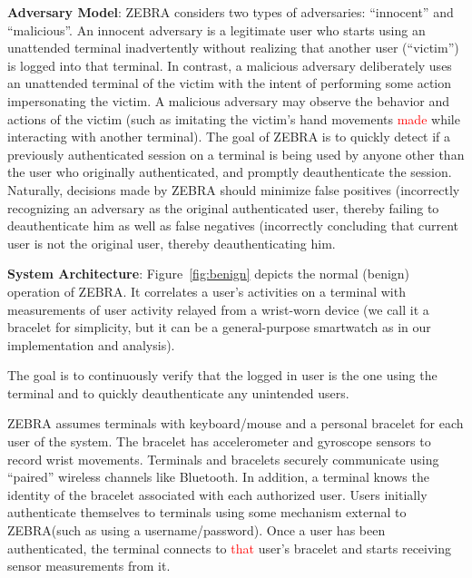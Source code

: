 \documentclass[conference]{IEEEtran}
\newcommand{\zebra}{ZEBRA\xspace}
\newif\ifabridged
\newcommand\changeMika[1]{\textcolor{red}{#1}}
\newcommand\changeAsokan[1]{\textcolor{red}{#1}}
\newcommand\changeMika[1]{{#1}}
\newcommand\changeAsokan[1]{{#1}}
\begin{document}
\vspace{2mm}
\noindent\textbf{Adversary Model}:
\zebra \changeMika{\cite{mare2014zebra}} considers two types of adversaries: ``innocent'' and ``malicious''. An innocent adversary is a legitimate user who starts using an unattended terminal inadvertently without realizing that another user (``victim'') is logged into that terminal. In contrast, a malicious adversary deliberately uses an unattended terminal of the victim with the intent of performing some action impersonating the victim. A malicious adversary may observe the behavior and actions of the victim (such as imitating the victim's hand movements \changeAsokan{made} while interacting with another terminal). The goal of \zebra is to quickly detect if a previously authenticated session on a terminal is being used by anyone other than the user who originally authenticated, and promptly deauthenticate the session. Naturally, decisions made by \zebra should minimize false positives
(incorrectly recognizing an adversary as the original authenticated user, thereby failing to deauthenticate him as well as false negatives (incorrectly concluding that current user is not the original user, thereby deauthenticating him.

\vspace{2mm}
\noindent\textbf{System Architecture}:
Figure~\ref{fig:benign} depicts the normal (benign) operation of \zebra.
It correlates a user's activities on a terminal with measurements of user activity relayed from a wrist-worn device (we call it a bracelet for simplicity, but it can be a general-purpose smartwatch as in our implementation and analysis). 
\ifabridged
\else
The goal is to continuously verify that the logged in user is the one using the terminal and to quickly deauthenticate any unintended users. 
\fi
\zebra assumes terminals with keyboard/mouse and a personal bracelet for each user of the system. The bracelet has accelerometer and gyroscope sensors to record wrist movements. Terminals and bracelets securely communicate using ``paired'' wireless channels like Bluetooth. In addition, a terminal knows the identity of the bracelet associated with each authorized user. Users initially authenticate themselves to terminals using some mechanism external to \zebra (such as using a username/password). Once a user has been authenticated, the terminal connects to \changeAsokan{that} user's bracelet and starts receiving sensor measurements from it.
\end{document}
